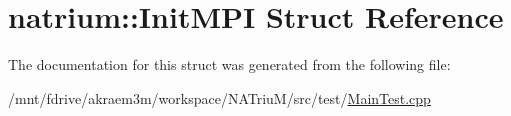 \hypertarget{structnatrium_1_1InitMPI}{
\section{natrium::InitMPI Struct Reference}
\label{structnatrium_1_1InitMPI}
}


The documentation for this struct was generated from the following file:\begin{DoxyCompactItemize}
\item 
/mnt/fdrive/akraem3m/workspace/NATriuM/src/test/\hyperlink{MainTest_8cpp}{MainTest.cpp}\end{DoxyCompactItemize}
